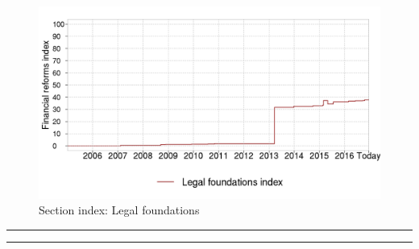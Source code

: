 \documentclass[a4paper,12pt,leqno]{article}
\makeatletter
\renewenvironment{titlepage}
{%
  \cleardoublepage
  \if@twocolumn
  \@restonecoltrue\onecolumn
  \else
  \@restonecolfalse\newpage
  \fi
  \thispagestyle{empty}%
}%
{\if@restonecol\twocolumn \else \newpage \fi
}
\renewenvironment{titlepage}
{%
  \cleardoublepage
  \if@twocolumn
  \@restonecoltrue\onecolumn
  \else
  \@restonecolfalse\newpage
  \fi
  \thispagestyle{empty}%
}%
{\if@restonecol\twocolumn \else \newpage \fi
  \if@twoside\else
  \fi
}
\newlength{\textwidthorig}
\makeatother
\begin{document}
\begin{figure}[H]
\caption{Section index: Legal foundations}
\centering
\includegraphics[width=0.9\paperwidth,height=0.7\paperwidth]{../GRAPHS/frm_index_legal_foundations.png}
\end{figure}

\begin{titlepage}

  \parbox{\textwidthorig}{
  \hrule
  \vspace{\baselineskip} 
  \vspace{\baselineskip}
  \hrule
  }

  \parbox{\textwidthorig}{
}

\end{titlepage}

\end{document}

